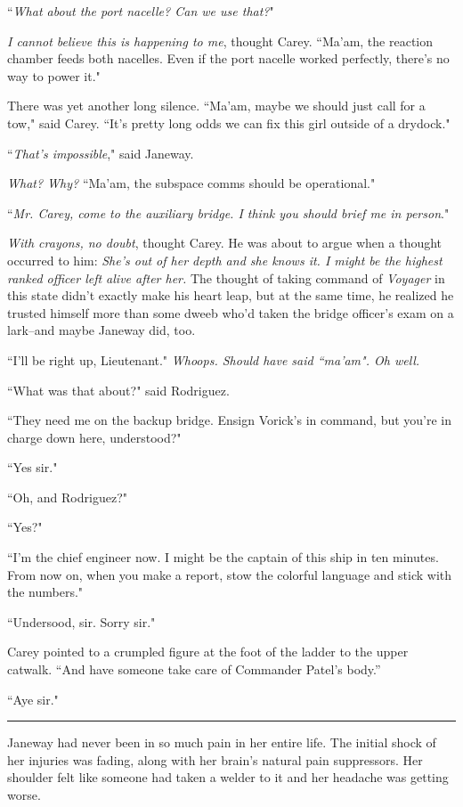 \documentclass[twoside,letterpaper,12pt]{memoir}
\begin{document}
``\textit{What about the port nacelle? Can we use that?}"

\textit{I cannot believe this is happening to me}, thought Carey. ``Ma'am, the reaction chamber feeds both nacelles. Even if the port nacelle worked perfectly, there's no way to power it."

There was yet another long silence. ``Ma'am, maybe we should just call for a tow," said Carey. ``It's pretty long odds we can fix this girl outside of a drydock."

``\textit{That's impossible}," said Janeway.

\textit{What? Why?} ``Ma'am, the subspace comms should be operational."

``\textit{Mr. Carey, come to the auxiliary bridge. I think you should brief me in person}."

\textit{With crayons, no doubt}, thought Carey. He was about to argue when a thought occurred to him: \textit{She's out of her depth and she knows it. I might be the highest ranked officer left alive after her.} The thought of taking command of \textit{Voyager} in this state didn't exactly make his heart leap, but at the same time, he realized he trusted himself more than some dweeb who'd taken the bridge officer's exam on a lark--and maybe Janeway did, too.

``I'll be right up, Lieutenant." \textit{Whoops. Should have said ``ma'am". Oh well.}

``What was that about?" said Rodriguez.

``They need me on the backup bridge. Ensign Vorick’s in command, but you’re in charge down here, understood?"

``Yes sir."

``Oh, and Rodriguez?"

``Yes?"

``I’m the chief engineer now. I might be the captain of this ship in ten minutes. From now on, when you make a report, stow the colorful language and stick with the numbers."

``Undersood, sir. Sorry sir."

Carey pointed to a crumpled figure at the foot of the ladder to the upper catwalk. ``And have someone take care of Commander Patel’s body.''

``Aye sir."

\begin{center}\rule{3cm}{0.4 pt}\end{center}

Janeway had never been in so much pain in her entire life. The initial shock of her injuries was fading, along with her brain's natural pain suppressors. Her shoulder felt like someone had taken a welder to it and her headache was getting worse.
\end{document}
